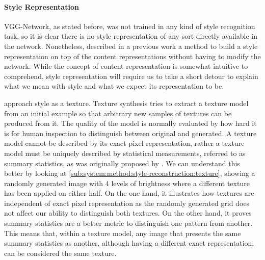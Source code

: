 \paragraph{Style Representation}
VGG-Network, as stated before, was not trained in any kind of style recognition task, so it is clear there is no style representation of any sort directly available in the network.
Nonetheless, \citeauthor{Gatys2015A} described in a previous work \cite{Gatys2015A} a method to build a style representation on top of the content representations without having to modify the network.
While the concept of content representation is somewhat intuitive to comprehend, style representation will require us to take a short detour to explain what we mean with style and what we expect its representation to be.

\citeauthor{Gatys2015A} approach style as a texture.
Texture synthesis tries to extract a texture model from an initial example so that arbitrary new samples of textures can be produced from it.
The quality of the model is normally evaluated by how hard it is for human inspection to distinguish between original and generated.
A texture model cannot be described by its exact pixel representation, rather a texture model must be uniquely described by statistical measurements, referred to as summary statistics, as was originally proposed by \citet{Julesz1962}.
We can understand this better by looking at \autoref{sub:system:method:style-reconstruction:texture}, showing a randomly generated image with 4 levels of brightness where a different texture has been applied on either half.
On the one hand, it illustrates how textures are independent of exact pixel representation as the randomly generated grid does not affect our ability to distinguish both textures.
On the other hand, it proves summary statistics are a better metric to distinguish one pattern from another.
This means that, within a texture model, any image that presents the same summary statistics as another, although having a different exact representation, can be considered the same texture.

